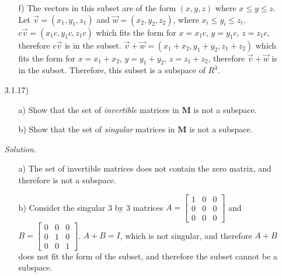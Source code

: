 \documentclass[12pt]{article}
\begin{document}
\begin{itemize}
\begin{itemize}
\item[f)] The vectors in this subset are of the form $(x, y, z)$ where $x \leq y \leq z$. Let $\vec{v}=(x_1,y_1,z_1)$ and $\vec{w}=(x_2,y_2,z_2)$, where $x_i \leq y_i \leq z_i$. $c\vec{v}=(x_1c,y_1c,z_1c)$ which fits the form for $x=x_1c$, $y=y_1c$, $z=z_1c$, therefore $c\vec{v}$ is in the subset. $\vec{v}+\vec{w}=(x_1+x_2,y_1+y_2,z_1+z_2)$ which fits the form for $x=x_1+x_2$, $y=y_1+y_2$, $z=z_1+z_2$, therefore $\vec{v}+\vec{w}$ is in the subset. Therefore, this subset is a subspace of $R^3$.
\end{itemize}

\item[3.1.17)]
\begin{itemize}
\item[a)] Show that the set of \textit{invertible} matrices in $\mathbf{M}$ is not a subspace. 
\item[b)] Show that the set of \textit{singular} matrices in $\mathbf{M}$ is not a subspace.
\end{itemize}

\textit{Solution.}
\begin{itemize}
\item[a)] The set of invertible matrices does not contain the zero matrix, and therefore is not a subspace.
\item[b)] Consider the singular 3 by 3 matrices $A=\left[\begin{array}{ccc} 1 & 0 & 0 \\ 0 & 0 & 0 \\ 0 & 0 & 0\end{array}\right]$ and $B=\left[\begin{array}{ccc} 0 & 0 & 0 \\ 0 & 1 & 0 \\ 0 & 0 & 1\end{array}\right]$. $A+B=I$, which is not singular, and therefore $A+B$ does not fit the form of the subset, and therefore the subset cannot be a subspace.
\end{itemize}


\end{itemize}
\end{document}
